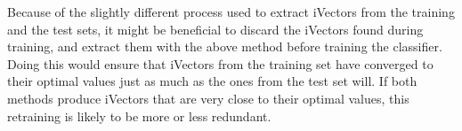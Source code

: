Because of the slightly different process used to extract iVectors from the training and the test sets, it might be beneficial to discard the iVectors found during training, and extract them with the above method before training the classifier. Doing this would ensure that iVectors from the training set have converged to their optimal values just as much as the ones from the test set will. If both methods produce iVectors that are very close to their optimal values, this retraining is likely to be more or less redundant.